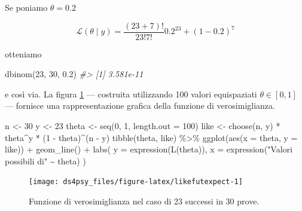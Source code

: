 \documentclass[
  11pt,
]{krantz}
\makeatletter
\newenvironment{Shaded}{\begin{snugshade}}{\end{snugshade}}
\newcommand{\AttributeTok}[1]{\textcolor[rgb]{0.61,0.61,0.61}{#1}}
\newcommand{\CommentTok}[1]{\textcolor[rgb]{0.37,0.37,0.37}{\textit{#1}}}
\newcommand{\DecValTok}[1]{\textcolor[rgb]{0.06,0.06,0.06}{#1}}
\newcommand{\FloatTok}[1]{\textcolor[rgb]{0.06,0.06,0.06}{#1}}
\newcommand{\FunctionTok}[1]{\textcolor[rgb]{0,0,0}{#1}}
\newcommand{\NormalTok}[1]{#1}
\newcommand{\OtherTok}[1]{\textcolor[rgb]{0.37,0.37,0.37}{#1}}
\newcommand{\SpecialCharTok}[1]{\textcolor[rgb]{0,0,0}{#1}}
\newcommand{\StringTok}[1]{\textcolor[rgb]{0.5,0.5,0.5}{#1}}
\newenvironment{kframe}{%
\medskip{}
\setlength{\fboxsep}{.8em}
 \def\at@end@of@kframe{}%
 \ifinner\ifhmode%
  \def\at@end@of@kframe{\end{minipage}}%
  \begin{minipage}{\columnwidth}%
 \fi\fi%
 \def\FrameCommand##1{\hskip\@totalleftmargin \hskip-\fboxsep
 \colorbox{shadecolor}{##1}\hskip-\fboxsep
     \hskip-\linewidth \hskip-\@totalleftmargin \hskip\columnwidth}%
 \MakeFramed {\advance\hsize-\width
   \@totalleftmargin\z@ \linewidth\hsize
   \@setminipage}}%
 {\par\unskip\endMakeFramed%
 \at@end@of@kframe}
\renewenvironment{Shaded}{\begin{kframe}}{\end{kframe}}
\theoremstyle{definition}
\theoremstyle{definition}
\theoremstyle{definition}
\theoremstyle{definition}
\theoremstyle{remark}
\makeatother
\begin{document}
Se poniamo \(\theta = 0.2\)

\[
\mathcal{L}(\theta \mid y) = \frac{(23 + 7)!}{23!7!} 0.2^{23} + (1-0.2)^7
\]

otteniamo

\begin{Shaded}
\begin{Highlighting}[]
\FunctionTok{dbinom}\NormalTok{(}\DecValTok{23}\NormalTok{, }\DecValTok{30}\NormalTok{, }\FloatTok{0.2}\NormalTok{)}
\CommentTok{\#\textgreater{} [1] 3.581e{-}11}
\end{Highlighting}
\end{Shaded}

e così via. La figura \ref{fig:likefutexpect} --- costruita utilizzando 100 valori equispaziati \(\theta \in [0, 1]\) --- fornisce una rappresentazione grafica della funzione di verosimiglianza.

\begin{Shaded}
\begin{Highlighting}[]
\NormalTok{n }\OtherTok{\textless{}{-}} \DecValTok{30}
\NormalTok{y }\OtherTok{\textless{}{-}} \DecValTok{23}
\NormalTok{theta }\OtherTok{\textless{}{-}} \FunctionTok{seq}\NormalTok{(}\DecValTok{0}\NormalTok{, }\DecValTok{1}\NormalTok{, }\AttributeTok{length.out =} \DecValTok{100}\NormalTok{)}
\NormalTok{like }\OtherTok{\textless{}{-}} \FunctionTok{choose}\NormalTok{(n, y) }\SpecialCharTok{*}\NormalTok{ theta}\SpecialCharTok{\^{}}\NormalTok{y }\SpecialCharTok{*}\NormalTok{ (}\DecValTok{1} \SpecialCharTok{{-}}\NormalTok{ theta)}\SpecialCharTok{\^{}}\NormalTok{(n }\SpecialCharTok{{-}}\NormalTok{ y)}
\FunctionTok{tibble}\NormalTok{(theta, like) }\SpecialCharTok{\%\textgreater{}\%}
  \FunctionTok{ggplot}\NormalTok{(}\FunctionTok{aes}\NormalTok{(}\AttributeTok{x =}\NormalTok{ theta, }\AttributeTok{y =}\NormalTok{ like)) }\SpecialCharTok{+}
  \FunctionTok{geom\_line}\NormalTok{() }\SpecialCharTok{+}
  \FunctionTok{labs}\NormalTok{(}
    \AttributeTok{y =} \FunctionTok{expression}\NormalTok{(}\FunctionTok{L}\NormalTok{(theta)),}
    \AttributeTok{x =} \FunctionTok{expression}\NormalTok{(}\StringTok{"Valori possibili di"} \SpecialCharTok{\textasciitilde{}}\NormalTok{ theta)}
\NormalTok{  )}
\end{Highlighting}
\end{Shaded}

\begin{figure}

{\centering \texttt{[image: ds4psy\_files/figure-latex/likefutexpect-1]} 

}

\caption{Funzione di verosimiglianza nel caso di 23 successi in 30 prove.}\label{fig:likefutexpect}
\end{figure}
\end{document}
